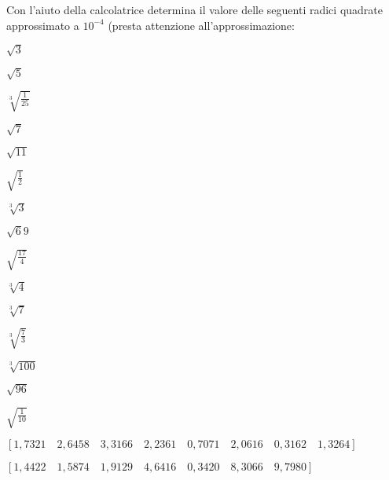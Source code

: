 \begin{esercizio}
 \label{ese:2.03}
Con l'aiuto della calcolatrice determina il valore delle seguenti radici 
quadrate approssimato a \(10^{-4}\) (presta attenzione all'approssimazione:
\vspace{-.7em}
 \begin{multicols}{5}
 \begin{enumeratea}
 \item \(\sqrt 3\)
 \item \(\sqrt 5\)
 \item \(\sqrt[3]{\frac{1}{25}}\)
 \item \(\sqrt 7\)
 \item \(\sqrt{11}\)
 \item \(\sqrt{\frac 1 2}\)
 \item \(\sqrt[3]3\)
 \item \(\sqrt 69\)
 \item \(\sqrt{\frac{17} 4}\)
 \item \(\sqrt[3]4\)
 \item \(\sqrt[3]7\)
 \item \(\sqrt[3]{\frac{7}{3}}\)
 \item \(\sqrt[3]{100}\)
 \item \(\sqrt{96}\)
 \item \(\sqrt{\frac{1}{10}}\)
 \end{enumeratea}
 \end{multicols}
\begin{flushright}
\vspace*{-8pt}
\([1,7321 \quad 2,6458 \quad 3,3166 \quad 2,2361 \quad 0,7071 \quad 
  2,0616 \quad 0,3162 \quad 1,3264]\) 
  
\([1,4422 \quad 1,5874 \quad 1,9129 \quad
  4,6416 \quad 0,3420 \quad 8,3066 \quad 9,7980]\) %
\end{flushright}
\end{esercizio}
\vspace{-1.0em}


